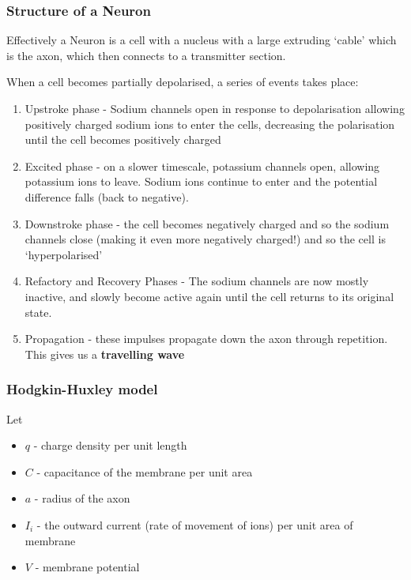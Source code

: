 \documentclass{X:/Documents/Coding/Latex/myassignment}
\begin{document}
\subsubsection{Structure of a Neuron}
Effectively a Neuron is a cell with a nucleus with a large extruding `cable' which is the axon, which then connects to a transmitter section.



When a cell becomes partially depolarised, a series of events takes place:
\begin{enumerate}
	\item Upstroke phase - Sodium channels open in response to depolarisation allowing positively charged sodium ions to enter the cells, decreasing the polarisation until the cell becomes positively charged
	\item Excited phase - on a slower timescale, potassium channels open, allowing potassium ions to leave. Sodium ions continue to enter and the potential difference falls (back to negative).
	\item Downstroke phase - the cell becomes negatively charged and so the sodium channels close (making it even more negatively charged!) and so the cell is `hyperpolarised'
	\item Refactory and Recovery Phases - The sodium channels are now mostly inactive, and slowly become active again until the cell returns to its original state.
	\item Propagation - these impulses propagate down the axon through repetition. This gives us a \textbf{travelling wave}
\end{enumerate}
\subsubsection{Hodgkin-Huxley model}
Let
\begin{itemize}
	\item $q$ - charge density per unit length
	\item $C$ - capacitance of the membrane per unit area
	\item $a$ - radius of the axon
	\item $I_i$ - the outward current (rate of movement of ions) per unit area of membrane
	\item $V$ - membrane potential 
\end{itemize}
\end{document}
